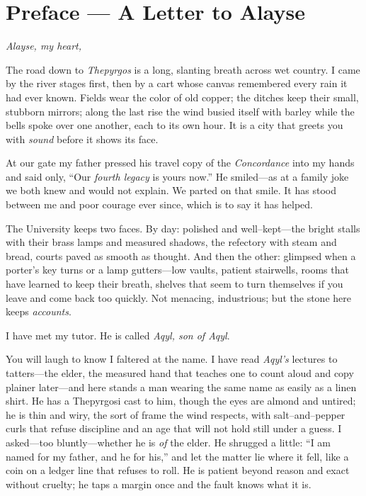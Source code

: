 \documentclass[11pt]{article}
\begin{document}
\clearpage
\section*{Preface — A Letter to Alayse}
\label{sec:preface-markus-to-alayse}
{}

\noindent\textit{Alayse, my heart,}

The road down to \textit{Thepyrgos} is a long, slanting breath across wet country. I came by the river stages first, then by a cart whose canvas remembered every rain it had ever known. Fields wear the color of old copper; the ditches keep their small, stubborn mirrors; along the last rise the wind busied itself with barley while the bells spoke over one another, each to its own hour. It is a city that greets you with \emph{sound} before it shows its face.

At our gate my father pressed his travel copy of the \emph{Concordance} into my hands and said only, “Our \emph{fourth legacy} is yours now.” He smiled—as at a family joke we both knew and would not explain. We parted on that smile. It has stood between me and poor courage ever since, which is to say it has helped.

\medskip
The University keeps two faces. By day: polished and well–kept—the bright stalls with their brass lamps and measured shadows, the refectory with steam and bread, courts paved as smooth as thought. And then the other: glimpsed when a porter’s key turns or a lamp gutters—low vaults, patient stairwells, rooms that have learned to keep their breath, shelves that seem to turn themselves if you leave and come back too quickly. Not menacing, industrious; but the stone here keeps \emph{accounts}.

I have met my tutor. He is called \textit{Aqyl, son of Aqyl}.

You will laugh to know I faltered at the name. I have read \emph{Aqyl’s} lectures to tatters—the elder, the measured hand that teaches one to count aloud and copy plainer later—and here stands a man wearing the same name as easily as a linen shirt. He has a Thepyrgosi cast to him, though the eyes are almond and untired; he is thin and wiry, the sort of frame the wind respects, with salt–and–pepper curls that refuse discipline and an age that will not hold still under a guess. I asked—too bluntly—whether he is \emph{of} the elder. He shrugged a little: “I am named for my father, and he for his,” and let the matter lie where it fell, like a coin on a ledger line that refuses to roll. He is patient beyond reason and exact without cruelty; he taps a margin once and the fault knows what it is.
\end{document}
